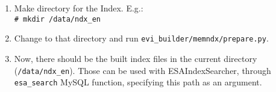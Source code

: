 \documentclass{article}
\begin{document}
\begin{enumerate}
\item Make directory for the Index. E.g.:\\
\texttt{\# mkdir /data/ndx\_en}
\item Change to that directory and run \texttt{evi\_builder/memndx/prepare.py}.
\item Now, there should be the built index files in the current directory (\texttt{/data/ndx\_en}). Those can be used with ESAIndexSearcher, through \texttt{esa\_search} MySQL function, specifying this path as an argument.
\end{enumerate}
\end{document}
